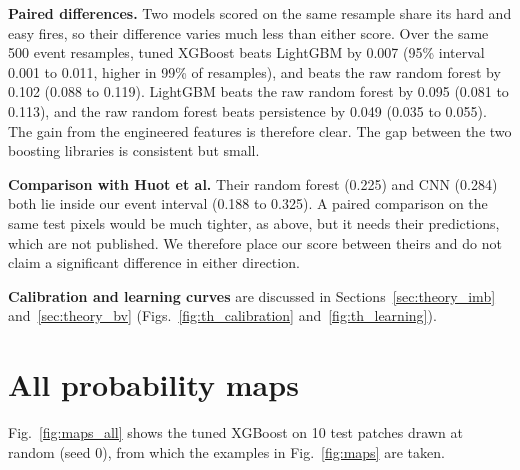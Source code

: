 \textbf{Paired differences.} Two models scored on the same resample share its hard and easy fires, so
their difference varies much less than either score. Over the same 500 event resamples, tuned XGBoost
beats LightGBM by 0.007 (95\% interval 0.001 to 0.011, higher in 99\% of resamples), and beats the raw
random forest by 0.102 (0.088 to 0.119). LightGBM beats the raw random forest by 0.095 (0.081 to 0.113),
and the raw random forest beats persistence by 0.049 (0.035 to 0.055). The gain from the engineered
features is therefore clear. The gap between the two boosting libraries is consistent but small.

\textbf{Comparison with Huot et al.} Their random forest (0.225) and CNN (0.284) both lie inside our
event interval (0.188 to 0.325). A paired comparison on the same test pixels would be much tighter, as
above, but it needs their predictions, which are not published. We therefore place our score between
theirs and do not claim a significant difference in either direction.

\textbf{Calibration and learning curves} are discussed in Sections~\ref{sec:theory_imb}
and~\ref{sec:theory_bv} (Figs.~\ref{fig:th_calibration} and~\ref{fig:th_learning}).

\section{All probability maps}
\label{app:maps}

Fig.~\ref{fig:maps_all} shows the tuned XGBoost on 10 test patches drawn at random (seed 0), from which
the examples in Fig.~\ref{fig:maps} are taken.
